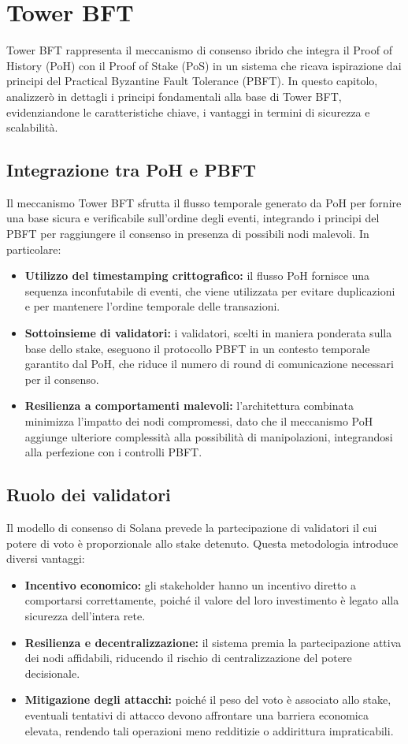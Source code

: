 \documentclass[a4paper,12pt]{report}
\begin{document}
	\section{Tower BFT}
	Tower BFT rappresenta il meccanismo di consenso ibrido che integra il Proof of History (PoH) con il Proof of Stake (PoS) in un sistema che ricava ispirazione dai principi del Practical Byzantine Fault Tolerance (PBFT). In questo capitolo, analizzerò in dettagli i principi fondamentali alla base di Tower BFT, evidenziandone le caratteristiche chiave, i vantaggi in termini di sicurezza e scalabilità.
	
	\subsection{Integrazione tra PoH e PBFT}
	Il meccanismo Tower BFT sfrutta il flusso temporale generato da PoH per fornire una base sicura e verificabile sull'ordine degli eventi, integrando i principi del PBFT per raggiungere il consenso in presenza di possibili nodi malevoli. In particolare:
	\begin{itemize}
		\item \textbf{Utilizzo del timestamping crittografico:} il flusso PoH fornisce una sequenza inconfutabile di eventi, che viene utilizzata per evitare duplicazioni e per mantenere l’ordine temporale delle transazioni.
		\item \textbf{Sottoinsieme di validatori:} i validatori, scelti in maniera ponderata sulla base dello stake, eseguono il protocollo PBFT in un contesto temporale garantito dal PoH, che riduce il numero di round di comunicazione necessari per il consenso.
		\item \textbf{Resilienza a comportamenti malevoli:} l’architettura combinata minimizza l’impatto dei nodi compromessi, dato che il meccanismo PoH aggiunge ulteriore complessità alla possibilità di manipolazioni, integrandosi alla perfezione con i controlli PBFT.
	\end{itemize}
	
	\subsection{Ruolo dei validatori}
	Il modello di consenso di Solana prevede la partecipazione di validatori il cui potere di voto è proporzionale allo stake detenuto. Questa metodologia introduce diversi vantaggi:
	\begin{itemize}
		\item \textbf{Incentivo economico:} gli stakeholder hanno un incentivo diretto a comportarsi correttamente, poiché il valore del loro investimento è legato alla sicurezza dell’intera rete.
		\item \textbf{Resilienza e decentralizzazione:} il sistema premia la partecipazione attiva dei nodi affidabili, riducendo il rischio di centralizzazione del potere decisionale.
		\item \textbf{Mitigazione degli attacchi:} poiché il peso del voto è associato allo stake, eventuali tentativi di attacco devono affrontare una barriera economica elevata, rendendo tali operazioni meno redditizie o addirittura impraticabili.
	\end{itemize}
	
\end{document}
